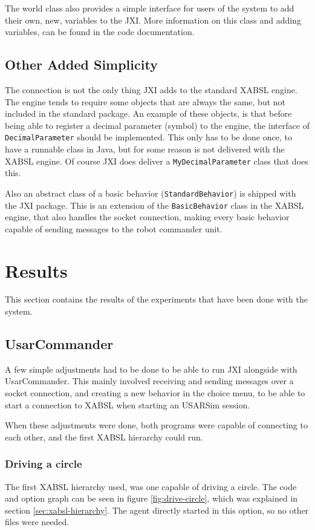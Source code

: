\documentclass[a4paper,10pt]{article}
\begin{document}
The world class also provides a simple interface for users of the system to add
their own, new, variables to the JXI. More information on this class and adding
variables, can be found in the code documentation.

\subsection{Other Added Simplicity}
The connection is not the only thing JXI adds to the standard XABSL engine. The
engine tends to require some objects that are always the same, but not included
in the standard package. An example of
these objects, is that before being able to register a decimal parameter
(symbol) to the engine, the interface of \texttt{DecimalParameter} should be
implemented. This only has to be done once, to have a runnable class in Java,
but for some reason is not delivered with the XABSL engine. Of course JXI does
deliver a \texttt{MyDecimalParameter} class that does this.

Also an abstract class of a basic behavior (\texttt{StandardBehavior}) is
shipped with the JXI package. This is an extension of the \texttt{BasicBehavior}
class in the XABSL engine, that also handles the socket connection, making every
basic behavior capable of sending messages to the robot commander unit.

\section{Results}
This section contains the results of the experiments that have been done with
the system. 
\subsection{UsarCommander}
A few simple adjustments had to be done to be able to run JXI alongside with
UsarCommander. This mainly involved receiving and sending messages over a socket
connection, and creating a new behavior in the choice menu, to be able to start
a connection to XABSL when starting an USARSim session. 

When these adjustments were done, both programs were capable of connecting to
each other, and the first XABSL hierarchy could run. 

\subsubsection{Driving a circle}
The first XABSL hierarchy used, was one capable of driving a circle. The code
and option graph can be seen in figure \ref{fig:drive-circle}, which was
explained in section \ref{sec:xabsl-hierarchy}. The agent directly started in
this option, so no other files were needed. 
\end{document}
